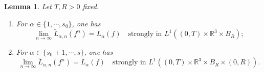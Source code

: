 \documentclass[reqno,11pt]{amsart}
\newtheorem{lemma}{Lemma}[section]
\numberwithin{equation}{section}
\def\R{\mathbb{R}}
\begin{document}
\begin{lemma}\label{converge L}
	Let $T,R>0$ fixed. 
	\begin{enumerate}
		\item {For $\alpha \in \{1,\cdots,s_0\}$, one has
			\begin{equation}
				\lim \limits_{n\rightarrow \infty} \tilde{L}_{\alpha,n} (f^n) = L_\alpha(f) \quad \text{strongly in } L^1 ((0,T)\times \R^3\times B_R);
		\end{equation}}
		\item{For $\alpha \in \{s_0+1,\cdots,s\}$, one has
			\begin{equation}
			\lim \limits_{n\rightarrow \infty} \tilde{L}_{\alpha,n} (f^n) = L_\alpha(f) \quad \text{strongly in } L^1 ((0,T)\times \R^3\times B_R\times (0,R)).
		\end{equation}}
	\end{enumerate}
\end{lemma}
\end{document}

